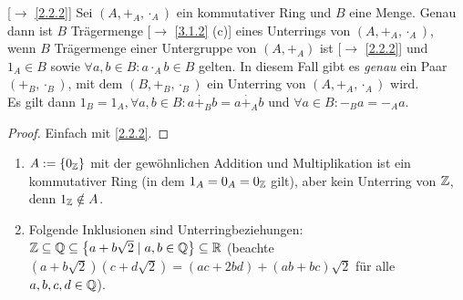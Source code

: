 \documentclass[../../main.tex]{subfiles}
\begin{document}
\begin{pro}\label{3.2.2}{\rm[$\to$ \ref{2.2.2}]}
Sei $(A,+_A,\cdot_A)$ ein kommutativer Ring und $B$ eine Menge. Genau dann ist $B$ Trägermenge {\rm[$\to$ \ref{3.1.2} (c)]} eines Unterrings von $(A,+_A,\cdot_A)$, wenn $B$ Trägermenge einer Untergruppe von $(A,+_A)$ ist {\rm[$\to$ \ref{2.2.2}]} und $1_A\in B$ sowie $\forall a,b\in B: a\cdot_A b\in B$ gelten. In diesem Fall gibt es \emph{genau} ein Paar $(+_B,\cdot_B)$, mit dem $(B,+_B,\cdot_B)$ ein Unterring von $(A,+_A,\cdot_A)$ wird.\\
Es gilt dann $1_B=1_A, \forall a,b\in B:a\overset\cdot +_B b = a\overset\cdot +_A b$ und $\forall a\in B: -_Ba = -_A a$.
\end{pro}
\begin{proof}
Einfach mit \ref{2.2.2}.
\end{proof}


\begin{bsp}\label{3.2.3}
\begin{enumerate}[\normalfont(a)]
\item $A:=\left\{0_\mathbb Z\right\}$ mit der gewöhnlichen Addition und Multiplikation ist ein kommutativer Ring (in dem $1_A=0_A=0_\mathbb Z$ gilt), aber kein Unterring von $\mathbb Z$, denn $1_\mathbb Z\notin A$.
\item Folgende Inklusionen sind Unterringbeziehungen: $\mathbb Z\subseteq \mathbb Q\subseteq\left\{a+b\sqrt{2}\mid a,b\in \mathbb Q\right\}\subseteq \mathbb R$ (beachte $(a+b\sqrt{2})(c+d\sqrt{2})=(ac+2bd)+(ab+bc)\sqrt{2}$ für alle $a,b,c,d\in \mathbb Q$).
\end{enumerate}
\end{bsp}
\end{document}
